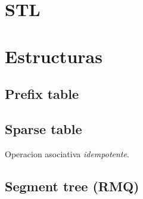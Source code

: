 

\def\title{Robado de Caloventor}
\tableofcontents\newpage
 
\section{STL}%



\section{Estructuras}%
\subsection{Prefix table}
\subsection{Sparse table}
Operacion asociativa \emph{idempotente}.
\subsection{Segment tree (RMQ)}
